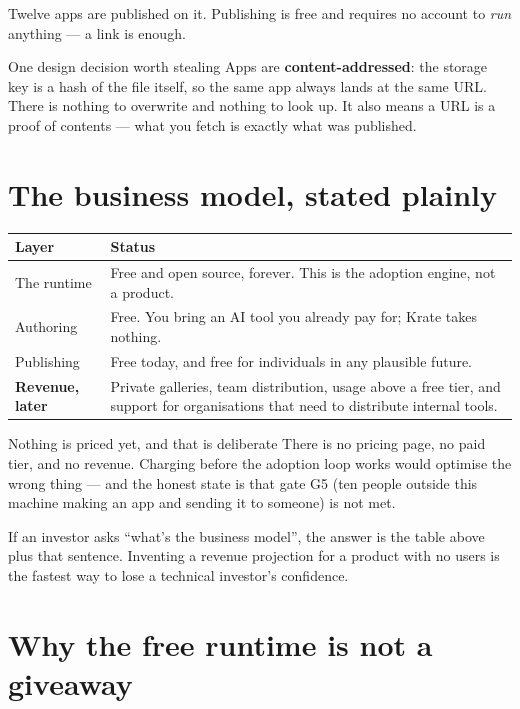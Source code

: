 \documentclass[11pt,a4paper]{report}
\begin{document}
Twelve apps are published on it. Publishing is free and requires no account
to \emph{run} anything --- a link is enough.

\begin{plainbox}{One design decision worth stealing}
Apps are \textbf{content-addressed}: the storage key is a hash of the file
itself, so the same app always lands at the same URL. There is nothing to
overwrite and nothing to look up. It also means a URL is a proof of
contents --- what you fetch is exactly what was published.
\end{plainbox}

\section{The business model, stated plainly}

\begin{center}
\begin{tabular}{lp{8.2cm}}
\toprule
\textbf{Layer} & \textbf{Status} \\
\midrule
The runtime & Free and open source, forever. This is the adoption engine,
  not a product. \\
Authoring & Free. You bring an AI tool you already pay for; Krate takes
  nothing. \\
Publishing & Free today, and free for individuals in any plausible future. \\
\midrule
\textbf{Revenue, later} & Private galleries, team distribution, usage above
  a free tier, and support for organisations that need to distribute
  internal tools. \\
\bottomrule
\end{tabular}
\end{center}

\begin{warnbox}{Nothing is priced yet, and that is deliberate}
There is no pricing page, no paid tier, and no revenue. Charging before the
adoption loop works would optimise the wrong thing --- and the honest state
is that gate G5 (ten people outside this machine making an app and sending
it to someone) is not met.

If an investor asks ``what's the business model'', the answer is the table
above plus that sentence. Inventing a revenue projection for a product with
no users is the fastest way to lose a technical investor's confidence.
\end{warnbox}

\section{Why the free runtime is not a giveaway}
\end{document}

